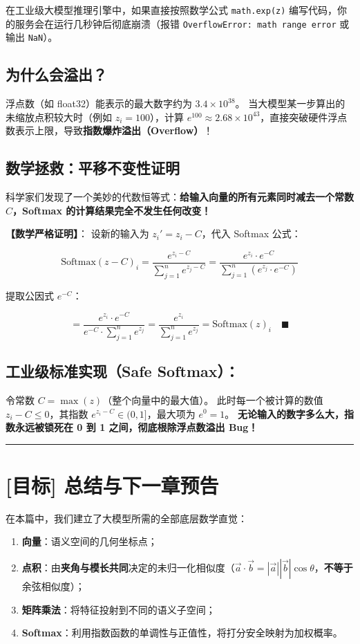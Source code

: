 在工业级大模型推理引擎中，如果直接按照数学公式 \texttt{math.exp(z)} 编写代码，你的服务会在运行几秒钟后彻底崩溃（报错 \texttt{OverflowError: math range error} 或输出 \texttt{NaN}）。

\subsection{为什么会溢出？}

浮点数（如 float32）能表示的最大数字约为 $3.4 \times 10^{38}$。
当大模型某一步算出的未缩放点积较大时（例如 $z_i = 100$），计算 $e^{100} \approx 2.68 \times 10^{43}$，直接突破硬件浮点数表示上限，导致\textbf{指数爆炸溢出（Overflow）}！

\subsection{数学拯救：平移不变性证明}

科学家们发现了一个美妙的代数恒等式：\textbf{给输入向量的所有元素同时减去一个常数 $C$，Softmax 的计算结果完全不发生任何改变！}

\textbf{【数学严格证明】}：
设新的输入为 $z_i' = z_i - C$，代入 Softmax 公式：

\[
\text{Softmax}(z - C)_i = \frac{e^{z_i - C}}{\sum_{j=1}^n e^{z_j - C}}
= \frac{e^{z_i} \cdot e^{-C}}{\sum_{j=1}^n (e^{z_j} \cdot e^{-C})}
\]

提取公因式 $e^{-C}$：

\[
= \frac{e^{z_i} \cdot e^{-C}}{e^{-C} \cdot \sum_{j=1}^n e^{z_j}}
= \frac{e^{z_i}}{\sum_{j=1}^n e^{z_j}} = \text{Softmax}(z)_i \quad \blacksquare
\]

\subsection{工业级标准实现（Safe Softmax）：}

令常数 $C = \max(z)$（整个向量中的最大值）。
此时每一个被计算的数值 $z_i - C \le 0$，其指数 $e^{z_i - C} \in (0, 1]$，最大项为 $e^0 = 1$。
\textbf{无论输入的数字多么大，指数永远被锁死在 0 到 1 之间，彻底根除浮点数溢出 Bug！}

\vspace{0.8em}\hrule\vspace{0.8em}

\section{[目标] 总结与下一章预告}

在本篇中，我们建立了大模型所需的全部底层数学直觉：
\begin{enumerate}
  \item \textbf{向量}：语义空间的几何坐标点；
  \item \textbf{点积}：由\textbf{夹角与模长共同}决定的未归一化相似度（$\vec a\cdot\vec b = |\vec a||\vec b|\cos\theta$，\textbf{不等于}余弦相似度）；
  \item \textbf{矩阵乘法}：将特征投射到不同的语义子空间；
  \item \textbf{Softmax}：利用指数函数的单调性与正值性，将打分安全映射为加权概率。
\end{enumerate}

